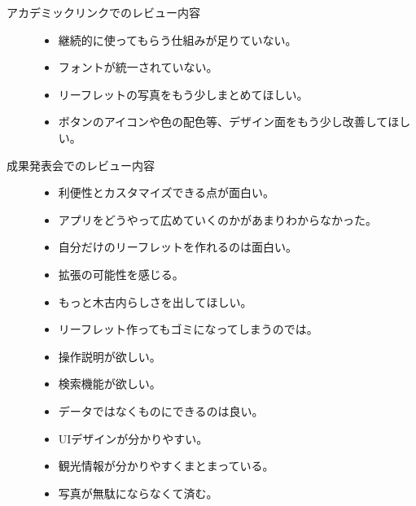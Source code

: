 \begin{description}
\item[アカデミックリンクでのレビュー内容]\mbox{}
 \begin{itemize}
 \item 継続的に使ってもらう仕組みが足りていない。
 \item フォントが統一されていない。
 \item リーフレットの写真をもう少しまとめてほしい。
 \item ボタンのアイコンや色の配色等、デザイン面をもう少し改善してほしい。
 \end{itemize}
\item[成果発表会でのレビュー内容]\mbox{}
 \begin{itemize}
 \item 利便性とカスタマイズできる点が面白い。
 \item アプリをどうやって広めていくのかがあまりわからなかった。
 \item 自分だけのリーフレットを作れるのは面白い。
 \item 拡張の可能性を感じる。
 \item もっと木古内らしさを出してほしい。
 \item リーフレット作ってもゴミになってしまうのでは。
 \item 操作説明が欲しい。
 \item 検索機能が欲しい。
 \item データではなくものにできるのは良い。
 \item UIデザインが分かりやすい。
 \item 観光情報が分かりやすくまとまっている。
 \item 写真が無駄にならなくて済む。
 \end{itemize}
\end{description}


